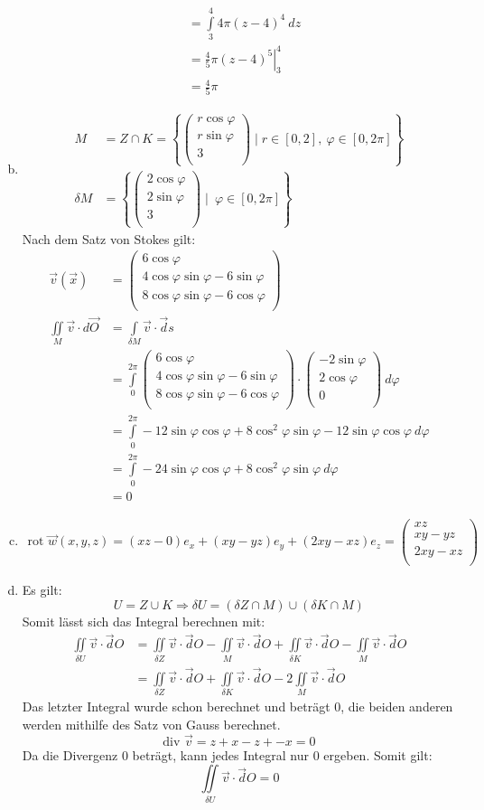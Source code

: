 \documentclass[10pt,a4paper,parskip=half]{scrartcl}
\newcommand{\vecthree}[3]{\begin{pmatrix}#1\\#2\\#3\\\end {pmatrix}}
\begin{document}
\begin{enumerate}[(a)]
\begin{align*}
                &= \int\limits_{3}^4 4\pi(z-4)^4   ~ dz \\
                &= \left. \frac 45 \pi (z-4)^5 \right|^4_3    \\
                &= \frac 45 \pi
      \end{align*}
    \item 
    \begin{align*}
        M &= Z \cap K = \left\{ \vecthree{r \cos \varphi}{r\sin \varphi}{3} \mid r \in [0,2] ,~ \varphi \in [0,2\pi] \right\}  \\
        \delta M &=  \left\{ \vecthree{2 \cos \varphi}{2\sin \varphi}{3} \mid ~ \varphi \in [0,2\pi] \right\} 
    \end{align*}
    Nach dem Satz von Stokes gilt:
    \begin{align*}
        \vec v(\vec x) &= \vecthree{6\cos \varphi }{4 \cos \varphi \sin \varphi - 6\sin \varphi}{8 \cos \varphi \sin \varphi - 6\cos \varphi } \\
        \iint\limits_M \vec v \cdot d\vec O  &= \int\limits_{\delta M} \vec v  \cdot \vec ds \\
        &= \int\limits_{0}^{2\pi} \vecthree{6\cos \varphi }{4 \cos \varphi \sin \varphi - 6\sin \varphi}{8 \cos \varphi \sin \varphi - 6\cos \varphi }  \cdot  \vecthree{-2\sin \varphi}{2\cos \varphi}{0} ~ d\varphi \\
        &= \int\limits_{0}^{2\pi} -12 \sin \varphi\cos\varphi + 8 \cos^2 \varphi \sin \varphi - 12 \sin \varphi \cos \varphi ~ d \varphi \\
        &= \int\limits_{0}^{2\pi} -24 \sin \varphi\cos\varphi + 8 \cos^2 \varphi \sin \varphi  ~ d \varphi \\
        &= 0
    \end{align*}
    \item 
    \begin{align*}
      \text{rot } \vec w(x,y,z)  = \left( xz - 0 \right)e_x + \left( xy - yz \right)e_y + \left( 2xy - xz \right)e_z = \vecthree{xz}{xy -yz}{2xy - xz}
    \end{align*}
    \item Es gilt:
    \[ U = Z \cup K \Rightarrow \delta U = (\delta Z \cap M) \cup (\delta K \cap M)  \]
    Somit lässt sich das Integral berechnen mit:
    \begin{align*}
      \iint\limits_{\delta U} \vec v \cdot \vec dO &= \iint\limits_{\delta Z} \vec v \cdot \vec dO - \iint\limits_{M } \vec v \cdot \vec dO + \iint\limits_{\delta K} \vec v \cdot \vec dO - \iint\limits_{M } \vec v \cdot \vec dO\\ 
      &= \iint\limits_{\delta Z} \vec v \cdot \vec dO  + \iint\limits_{\delta K} \vec v \cdot \vec dO - 2\iint\limits_{M } \vec v \cdot \vec dO
    \end{align*}
    Das letzter Integral wurde schon berechnet und beträgt $0$, die beiden anderen werden mithilfe des Satz von Gauss berechnet.
    \[ \text{div } \vec v = z + x - z + - x = 0 \]
    Da die Divergenz 0 beträgt, kann jedes Integral nur 0 ergeben. Somit gilt:
    \[ \iint\limits_{\delta U} \vec v \cdot \vec dO = 0 \]
\end{enumerate}
\end{document}
